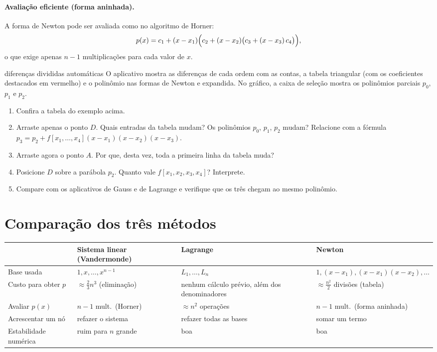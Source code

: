 \paragraph{Avaliação eficiente (forma aninhada).} A forma de Newton pode ser avaliada como
no algoritmo de Horner:
\[
p(x)=c_1+(x-x_1)\Bigl(c_2+(x-x_2)\bigl(c_3+(x-x_3)\,c_4\bigr)\Bigr),
\]
o que exige apenas $n-1$ multiplicações para cada valor de $x$.

\begin{atividade}{diferenças divididas automáticas}{\arqNewton}
O aplicativo mostra as diferenças de cada ordem com as contas, a tabela triangular (com os
coeficientes destacados em vermelho) e o polinômio nas formas de Newton e expandida. No
gráfico, a caixa de seleção mostra os polinômios parciais $p_0$, $p_1$ e $p_2$.
\begin{enumerate}[nosep]
  \item Confira a tabela do exemplo acima.
  \item Arraste apenas o ponto $D$. Quais entradas da tabela mudam? Os polinômios $p_0$, $p_1$, $p_2$ mudam? Relacione com a fórmula $p_3=p_2+f[x_1,\dots,x_4](x-x_1)(x-x_2)(x-x_3)$.
  \item Arraste agora o ponto $A$. Por que, desta vez, toda a primeira linha da tabela muda?
  \item Posicione $D$ sobre a parábola $p_2$. Quanto vale $f[x_1,x_2,x_3,x_4]$? Interprete.
  \item Compare com os aplicativos de Gauss e de Lagrange e verifique que os três chegam ao mesmo polinômio.
\end{enumerate}
\end{atividade}

\section{Comparação dos três métodos}

\begin{center}
\renewcommand{\arraystretch}{1.3}
\begin{tabular}{>{\raggedright\arraybackslash}p{3.4cm}>{\raggedright\arraybackslash}p{3.6cm}>{\raggedright\arraybackslash}p{3.6cm}>{\raggedright\arraybackslash}p{3.6cm}}
\toprule
 & Sistema linear (Vandermonde) & Lagrange & Newton\\
\midrule
Base usada & $1,x,\dots,x^{n-1}$ & $L_1,\dots,L_n$ & $1,(x-x_1),(x-x_1)(x-x_2),\dots$\\
Custo para obter $p$ & $\approx\frac23 n^3$ (eliminação) & nenhum cálculo prévio, além dos denominadores & $\approx\frac{n^2}{2}$ divisões (tabela)\\
Avaliar $p(x)$ & $n-1$ mult.\ (Horner) & $\approx n^2$ operações & $n-1$ mult.\ (forma aninhada)\\
Acrescentar um nó & refazer o sistema & refazer todas as bases & somar um termo\\
Estabilidade numérica & ruim para $n$ grande & boa & boa\\
\bottomrule
\end{tabular}
\end{center}

